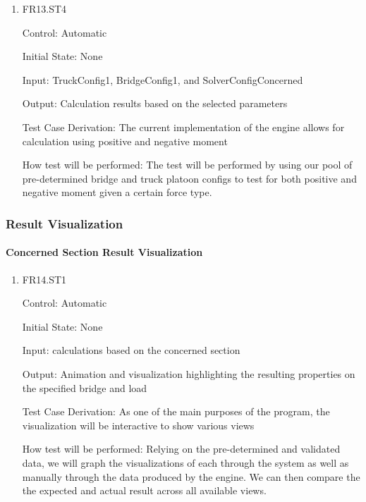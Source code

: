 \documentclass[12pt, titlepage]{article}
\begin{document}
\begin{enumerate}
\item{FR13.ST4\\}

Control: Automatic
					
Initial State: None
					
Input: TruckConfig1, BridgeConfig1, and SolverConfigConcerned 
					 
Output: Calculation results based on the selected parameters 

Test Case Derivation: The current implementation of the engine allows for calculation using positive and negative moment 

How test will be performed: The test will be performed by using our pool of pre-determined bridge and truck platoon configs to test for both positive and negative moment given a certain force type. 

\end{enumerate}

\subsubsection{Result Visualization}

\paragraph{Concerned Section Result Visualization}

\begin{enumerate}

\item{FR14.ST1\\}

Control: Automatic
				
Initial State: None
					
Input: calculations based on the concerned section 
					
Output: Animation and visualization highlighting the resulting properties on the specified bridge and load 

Test Case Derivation: As one of the main purposes of the program, the visualization will be interactive to show various views

How test will be performed: Relying on the pre-determined and validated data, we will graph the visualizations of each through the system as well as manually through the data produced by the engine. We can then compare the the expected and actual result across all available views. 
			
\end{enumerate}
\end{document}
